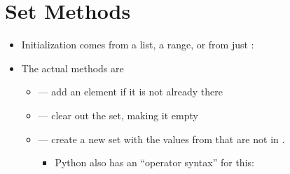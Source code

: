 \documentclass[letterpaper,10pt,english]{sphinxmanual}
\begin{document}
\section{Set Methods}
\label{\detokenize{lecture_notes/lec15_sets:set-methods}}\begin{itemize}
\item {} 
Initialization comes from a list, a range, or from just :

%
\begin{sphinxVerbatim}[commandchars=\\\{\}]
  
  
  \PYG{p}{[}        \PYG{p}{]}
  
\end{sphinxVerbatim}

\item {} 
The actual methods are
\begin{itemize}
\item {} 
 — add an element if it is not already there

\item {} 
 — clear out the set, making it empty

\item {} 
 — create a new set with the values from
 that are not in .
\begin{itemize}
\item {} 
Python also has an “operator syntax” for this:


\end{itemize}
\end{itemize}
\end{itemize}
\end{document}
